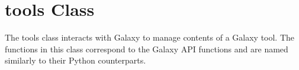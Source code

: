 \hypertarget{group__tools__class}{}\section{tools Class}
\label{group__tools__class}
The tools class interacts with Galaxy to manage contents of a Galaxy tool. The functions in this class correspond to the Galaxy A\+PI functions and are named similarly to their Python counterparts. 